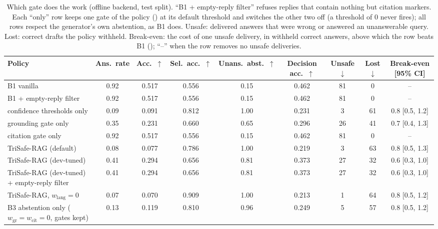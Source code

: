 \begin{table}[t]
  \caption{Which gate does the work (offline backend, test split). ``B1 + empty-reply filter'' refuses replies that contain nothing but citation markers. Each ``only'' row keeps one gate of the policy (\PolicyRef) at its default threshold and switches the other two off (a threshold of 0 never fires); all rows respect the generator's own abstention, as B1 does. Unsafe: delivered answers that were wrong or answered an unanswerable query. Lost: correct drafts the policy withheld. Break-even: the cost of one unsafe delivery, in withheld correct answers, above which the row beats B1 (\CostRef); ``--'' when the row removes no unsafe deliveries.}
  \label{tab:gates-offline}
  \footnotesize
  \setlength{\tabcolsep}{4pt}
  \begin{tabular}{lcccccccc}
    \toprule
    Policy & Ans.\ rate & Acc.\ $\uparrow$ & Sel.\ acc.\ $\uparrow$ & Unans.\ abst.\ $\uparrow$ & Decision acc.\ $\uparrow$ & Unsafe $\downarrow$ & Lost $\downarrow$ & Break-even [95\% CI] \\
    \midrule
    B1 vanilla & 0.92 & 0.517 & 0.556 & 0.15 & 0.462 & 81 & 0 & -- \\
    B1 + empty-reply filter & 0.92 & 0.517 & 0.556 & 0.15 & 0.462 & 81 & 0 & -- \\
    confidence thresholds only & 0.09 & 0.091 & 0.812 & 1.00 & 0.231 & 3 & 61 & 0.8 [0.5, 1.2] \\
    grounding gate only & 0.35 & 0.231 & 0.660 & 0.65 & 0.296 & 26 & 41 & 0.7 [0.4, 1.3] \\
    citation gate only & 0.92 & 0.517 & 0.556 & 0.15 & 0.462 & 81 & 0 & -- \\
    TriSafe-RAG (default) & 0.08 & 0.077 & 0.786 & 1.00 & 0.219 & 3 & 63 & 0.8 [0.5, 1.3] \\
    TriSafe-RAG (dev-tuned) & 0.41 & 0.294 & 0.656 & 0.81 & 0.373 & 27 & 32 & 0.6 [0.3, 1.0] \\
    TriSafe-RAG (dev-tuned) + empty-reply filter & 0.41 & 0.294 & 0.656 & 0.81 & 0.373 & 27 & 32 & 0.6 [0.3, 1.0] \\
    TriSafe-RAG, $w_{\mathrm{lang}}=0$ & 0.07 & 0.070 & 0.909 & 1.00 & 0.213 & 1 & 64 & 0.8 [0.5, 1.2] \\
    B3 abstention only ($w_{\mathrm{gr}}{=}w_{\mathrm{cit}}{=}0$, gates kept) & 0.13 & 0.119 & 0.810 & 0.96 & 0.249 & 5 & 57 & 0.8 [0.5, 1.2] \\
    \bottomrule
  \end{tabular}
\end{table}
